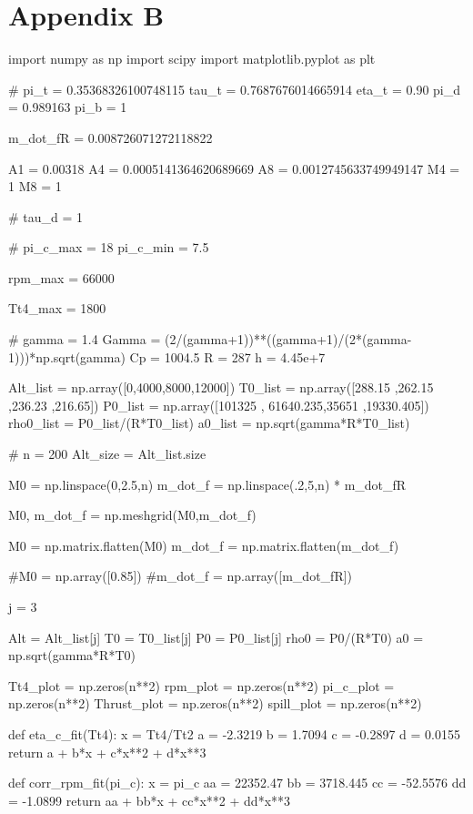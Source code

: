 \documentclass[journal ]{new-aiaa}
\begin{document}
\pagebreak

\section{Appendix B}
\begin{python}
import numpy as np
import scipy
import matplotlib.pyplot as plt

# %
pi_t = 0.35368326100748115
tau_t = 0.7687676014665914
eta_t = 0.90
pi_d =  0.989163
pi_b = 1

m_dot_fR = 0.008726071272118822

A1 = 0.00318
A4 = 0.0005141364620689669
A8 = 0.0012745633749949147
M4 = 1
M8 = 1

# %
tau_d = 1

# %
pi_c_max = 18
pi_c_min = 7.5

rpm_max = 66000

Tt4_max = 1800

# %
gamma = 1.4
Gamma = (2/(gamma+1))**((gamma+1)/(2*(gamma-1)))*np.sqrt(gamma)
Cp = 1004.5
R = 287
h = 4.45e+7

Alt_list = np.array([0,4000,8000,12000])
T0_list = np.array([288.15 ,262.15 ,236.23 ,216.65])
P0_list = np.array([101325 , 61640.235,35651 ,19330.405])
rho0_list = P0_list/(R*T0_list)
a0_list = np.sqrt(gamma*R*T0_list)

# %
n = 200
Alt_size = Alt_list.size

M0 = np.linspace(0,2.5,n)
m_dot_f = np.linspace(.2,5,n) * m_dot_fR

M0, m_dot_f = np.meshgrid(M0,m_dot_f)

M0 = np.matrix.flatten(M0)
m_dot_f = np.matrix.flatten(m_dot_f)

#M0 = np.array([0.85])
#m_dot_f =  np.array([m_dot_fR]) 

j = 3

Alt = Alt_list[j]
T0 = T0_list[j]
P0 = P0_list[j]
rho0 = P0/(R*T0)
a0 = np.sqrt(gamma*R*T0)


Tt4_plot = np.zeros(n**2)
rpm_plot = np.zeros(n**2)
pi_c_plot = np.zeros(n**2)
Thrust_plot = np.zeros(n**2)
spill_plot = np.zeros(n**2)

def eta_c_fit(Tt4):
        x = Tt4/Tt2
        a = -2.3219 
        b = 1.7094 
        c = -0.2897 
        d = 0.0155
        return a + b*x + c*x**2 + d*x**3

def corr_rpm_fit(pi_c):
    x = pi_c
    aa = 22352.47 
    bb = 3718.445 
    cc = -52.5576 
    dd = -1.0899
    return aa + bb*x + cc*x**2 + dd*x**3


\end{python}
\end{document}
